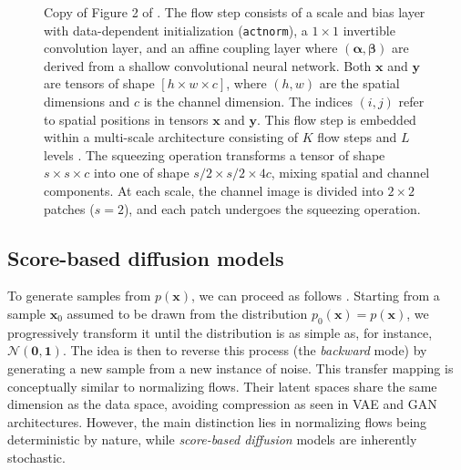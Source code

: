 \documentclass[fleqn,usenatbib]{mnras}
\begin{document}
\begin{figure}
    \caption{Copy of Figure 2 of \citep{Kingma2018}. The flow step consists of a scale and bias layer with data-dependent initialization (\texttt{actnorm}), a $1\times 1$ invertible convolution layer, and an affine coupling layer where $(\bm{\alpha},\bm{\beta})$ are derived from a shallow convolutional neural network. Both $\bm{x}$ and $\bm{y}$ are tensors of shape $[h \times w \times c]$, where $(h, w)$ are the spatial dimensions and $c$ is the channel dimension. The indices $(i, j)$ refer to spatial positions in tensors $\bm{x}$ and $\bm{y}$. This flow step is embedded within a multi-scale architecture consisting of $K$ flow steps and $L$ levels \citep{DinhSB17}. The squeezing operation transforms a tensor of shape $s \times s \times c$ into one of shape $s/2 \times s/2 \times 4c$, mixing spatial and channel components. At each scale, the channel image is divided into $2\times 2$ patches ($s=2$), and each patch undergoes the squeezing operation.}
    \label{fig-Glow-archi}
\end{figure}
%
\subsection{Score-based diffusion models}
\label{sec-diff}
%
To generate samples from $p(\bm{x})$, we can proceed as follows \citep[e.g.,][]{Chang2023,LinYang2023}. Starting from a sample $\bm{x}_0$ assumed to be drawn from the distribution $p_0(\bm{x})=p(\bm{x})$, we progressively transform it until the distribution is as simple as, for instance, $\mathcal{N}(\bm{0},\bm{1})$. The idea is then to reverse this process (the \textit{backward} mode) by generating a new sample from a new instance of noise. This transfer mapping is conceptually similar to normalizing flows. Their latent spaces share the same dimension as the data space, avoiding compression as seen in VAE and GAN architectures. However, the main distinction lies in normalizing flows being deterministic by nature, while \textit{score-based diffusion} models are inherently stochastic.
\end{document}
